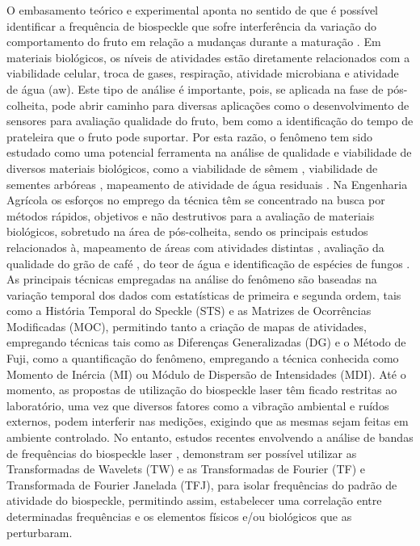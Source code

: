 \documentclass{elsarticle}
\begin{document}
O embasamento teórico e experimental aponta no sentido de que é possível identificar a frequência de biospeckle que sofre interferência da variação do comportamento do fruto em relação a mudanças durante a maturação \cite{Zdunek2014}. Em materiais biológicos, os níveis de atividades estão diretamente relacionados com a viabilidade celular, troca de gases, respiração, atividade microbiana e atividade de água (aw). Este tipo de análise é importante, pois, se aplicada na fase de pós-colheita, pode abrir caminho para diversas aplicações como o desenvolvimento de sensores para avaliação qualidade do fruto, bem como a identificação do tempo de prateleira que o fruto pode suportar. 
 Por esta razão, o fenômeno tem sido estudado como uma potencial ferramenta na análise de qualidade e viabilidade de diversos materiais biológicos, como a viabilidade de sêmem \cite{Henrique2007a}, viabilidade de sementes arbóreas \cite{Aparecida2011}, mapeamento de atividade de água residuais \cite{Viana2017}. 
Na Engenharia Agrícola os esforços no emprego da técnica têm se concentrado na busca por métodos rápidos, objetivos e não destrutivos para a avaliação de materiais biológicos, sobretudo na área de pós-colheita, sendo os principais estudos relacionados à, mapeamento de áreas com atividades distintas \cite{Rabelo2005}, avaliação da qualidade do grão de café \cite{Viana2017}, do teor de água e identificação de espécies de fungos \cite{Hadian2008a}. 
As principais técnicas empregadas na análise do fenômeno são baseadas na variação temporal dos dados com estatísticas de primeira e segunda ordem, tais como a História Temporal do Speckle (STS) e as Matrizes de Ocorrências Modificadas (MOC), permitindo tanto a criação de mapas de atividades, empregando técnicas tais como as Diferenças Generalizadas (DG) e o Método de Fuji, como a quantificação do fenômeno, empregando a técnica conhecida como Momento de Inércia (MI) ou Módulo de Dispersão de Intensidades (MDI). 
Até o momento, as propostas de utilização do biospeckle laser têm ficado restritas ao laboratório, uma vez que diversos fatores como a vibração ambiental e ruídos externos, podem interferir nas medições, exigindo que as mesmas sejam feitas em ambiente controlado. No entanto, estudos recentes envolvendo a análise de bandas de frequências do biospeckle laser \cite{Lama2016}, demonstram ser possível utilizar as Transformadas de Wavelets (TW) e as Transformadas de Fourier (TF) e Transformada de Fourier Janelada (TFJ), para isolar frequências do padrão de atividade do biospeckle, permitindo assim, estabelecer uma correlação entre determinadas frequências e os elementos físicos e/ou biológicos que as perturbaram.
\end{document}

